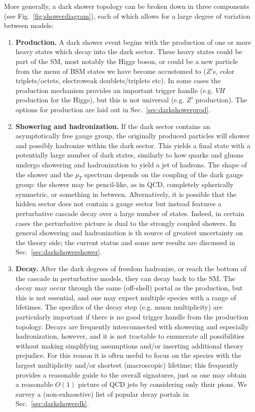 More generally, a dark shower topology can be broken down in three components (see Fig.~\ref{fig:showerdiagram}), each of which allows for a large degree of variation between models:
\begin{enumerate}
\item \textbf{Production.} A dark shower event begins with the production of one or more heavy states which decay into the dark sector. These heavy states could be part of the SM, most notably the Higgs boson, or could be a new particle from the menu of BSM states we have become accustomed to ($Z'$s, color triplets/octets, electroweak doublets/triplets etc). In some cases the production mechanism provides an important trigger handle (e.g. $VH$  production for the Higgs), but this is not universal (e.g. $Z'$ production). The options for production are laid out in Sec.~\ref{sec:darkshowerprod}.

\item \textbf{Showering and hadronization.} If the dark sector contains an asymptotically free gauge group, the originally produced particles will shower and possibly hadronize within the dark sector. This yields a final state with a potentially large number of dark states, similarly to how quarks and gluons undergo showering and hadronization to yield a jet of hadrons. The shape of the shower and the $p_T$ spectrum depends on the coupling of the dark gauge group: the shower may be pencil-like, as in QCD, completely spherically symmetric, or something in between. Alternatively, it is possible that the hidden sector does not contain a gauge sector but instead features a perturbative cascade decay over a large number of states. Indeed, in certain cases the perturbative picture is dual to the strongly coupled showers. In general showering and hadronization is th source of greatest uncertainty on the theory side; the current status and some new results are discussed in Sec.~\ref{sec:darkshowershower}. 

\item \textbf{Decay.} After the dark degrees of freedom hadronize, or reach the bottom of the cascade in perturbative models, they can decay back to the SM. The decay may occur through the same (off-shell) portal as the production, but this is not essential, and one may expect multiple species with a range of lifetimes. The specifics of the decay step (e.g. muon multiplicity) are particularly important if there is no good trigger handle from the production topology. Decays are frequently interconnected with showering and especially hadronization, however, and it is not tractable to enumerate all possibilities without making simplifying assumptions and/or inserting additional theory prejudice. For this reason it is often useful to focus on the species with the largest multiplicity and/or shortest (macroscopic) lifetime; this frequently provides a reasonable guide to the overall signatures, just as one may obtain a reasonable $O(1)$ picture of QCD jets by considering only their pions. We survey a (non-exhaustive) list of popular decay portals in Sec.~\ref{sec:darkshowerdk}.
 

\end{enumerate}
